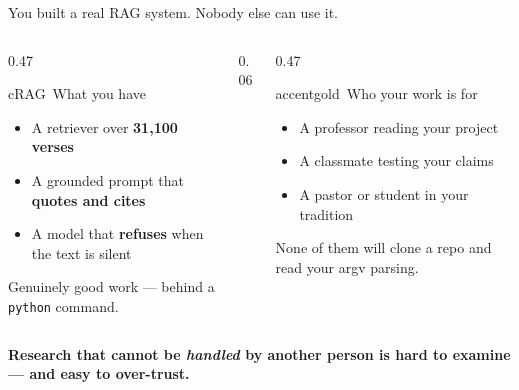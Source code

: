 \begin{frame}{You built a real RAG system. Nobody else can use it.}
  \begin{columns}[c, totalwidth=\textwidth]
    \begin{column}{0.47\textwidth}
      \begin{featbox}{cRAG}{\faTerminal\ What you have}
        \small
        \begin{itemize}
          \item A retriever over \textbf{31{,}100 verses}
          \item A grounded prompt that \textbf{quotes and cites}
          \item A model that \textbf{refuses} when the text is silent
        \end{itemize}
        {\scriptsize\color{midgray}Genuinely good work --- behind a \texttt{python} command.}
      \end{featbox}
    \end{column}
    \begin{column}{0.06\textwidth}\end{column}
    \begin{column}{0.47\textwidth}
      \begin{featbox}{accentgold}{\faUsers\ Who your work is for}
        \small
        \begin{itemize}
          \item A professor reading your project
          \item A classmate testing your claims
          \item A pastor or student in your tradition
        \end{itemize}
        {\scriptsize\color{midgray}None of them will clone a repo and read your argv parsing.}
      \end{featbox}
    \end{column}
  \end{columns}
  \vspace{10pt}
  \begin{center}\small\color{labnavy}\bfseries
    Research that cannot be \emph{handled} by another person is hard to examine --- and easy to over-trust.\end{center}
\end{frame}

